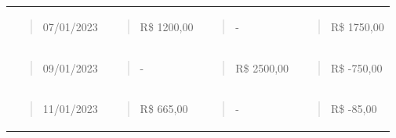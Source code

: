 {{\begin{longtable}[]{@{}llll@{}}
\begin{minipage}[t]{0.18\columnwidth}
\begin{quote}
07/01/2023
\end{quote}\strut
\end{minipage} & \begin{minipage}[t]{0.20\columnwidth}\raggedright
\begin{quote}
R\$ 1200,00
\end{quote}\strut
\end{minipage} & \begin{minipage}[t]{0.20\columnwidth}\raggedright
\begin{quote}
-
\end{quote}\strut
\end{minipage} & \begin{minipage}[t]{0.20\columnwidth}\raggedright
\begin{quote}
R\$ 1750,00
\end{quote}\strut
\end{minipage}\tabularnewline
\begin{minipage}[t]{0.18\columnwidth}\raggedright
\begin{quote}
09/01/2023
\end{quote}\strut
\end{minipage} & \begin{minipage}[t]{0.20\columnwidth}\raggedright
\begin{quote}
-
\end{quote}\strut
\end{minipage} & \begin{minipage}[t]{0.20\columnwidth}\raggedright
\begin{quote}
R\$ 2500,00
\end{quote}\strut
\end{minipage} & \begin{minipage}[t]{0.20\columnwidth}\raggedright
\begin{quote}
R\$ -750,00
\end{quote}\strut
\end{minipage}\tabularnewline
\begin{minipage}[t]{0.18\columnwidth}\raggedright
\begin{quote}
11/01/2023
\end{quote}\strut
\end{minipage} & \begin{minipage}[t]{0.20\columnwidth}\raggedright
\begin{quote}
R\$ 665,00
\end{quote}\strut
\end{minipage} & \begin{minipage}[t]{0.20\columnwidth}\raggedright
\begin{quote}
-
\end{quote}\strut
\end{minipage} & \begin{minipage}[t]{0.20\columnwidth}\raggedright
\begin{quote}
R\$ -85,00
\end{quote}\strut
\end{minipage}\tabularnewline
\bottomrule
\end{longtable}

}}
